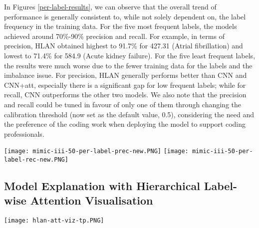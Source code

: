 \documentclass[final,5p,times,twocolumn]{elsarticle}
\begin{document}
In Figures \ref{per-label-results}, we can observe that the overall trend of performance is generally consistent to, while not solely dependent on, the label frequency in the training data. For the five most frequent labels, the models achieved around 70\%-90\% precision and recall. For example, in terms of precision, HLAN obtained highest to 91.7\% for 427.31 (Atrial fibrillation) and lowest to 71.4\% for 584.9 (Acute kidney failure). For the five least frequent labels, the results were much worse due to the fewer training data for the labels and the imbalance issue. For precision, HLAN generally performs better than CNN and CNN+att, especially there is a significant gap for low frequent labels; while for recall, CNN outperforms the other two models. We also note that the precision and recall could be tuned in favour of only one of them through changing the calibration threshold  (now set as the default value, 0.5), considering the need and the preference of the coding work when deploying the model to support coding professionals.

\begin{figure*}[t]
  \centering
  \texttt{[image: mimic-iii-50-per-label-prec-new.PNG]}
  \texttt{[image: mimic-iii-50-per-label-rec-new.PNG]}
  \caption{Precision and recall of the five most and the five least frequent ICD-9 diagnosis codes in the MIMIC-III-50 dataset. The bar chart (with the left y-axis) shows the metric score, while the line chart (with the right y-axis) shows the number of occurrences or the frequency (``Freq'') of the label in the training data.}\label{per-label-results}
\end{figure*}

\subsection{Model Explanation with Hierarchical Label-wise Attention Visualisation}
\label{sec:anal-att-viz}

\begin{figure*}[t]
  \texttt{[image: hlan-att-viz-tp.PNG]}
  \caption{An example of interpretation using attention visualisation from the Hierarchical Label-wise Attention Network (HLAN), the chosen example is a random document (index 24) in the MIMIC-III-50 dataset with two true positive labels, ICD-9 code 427.31 (Atrial fibrillation) and 428.0 (Congestive heart failure, unspecified). The two \colorbox{red}{red} columns show the sentence-level attention scores for the two codes respectively. The tokens highlighted by \colorbox{yellow}{yellow} (for code 427.31) or \colorbox{blue}{\textcolor{white}{blue}} (for code 428.0) show the importance of them based on the value of sentence-weighted word-level attention scores. The deeper the colour, the higher the (sentence-weighted) attention scores, and thus the more important the highlight words or sentences contributes to the model prediction. Only the first part (11 tokens) of each sentence was shown for a clearer display.}\label{hlan_att_viz}
\end{figure*}
\end{document}
